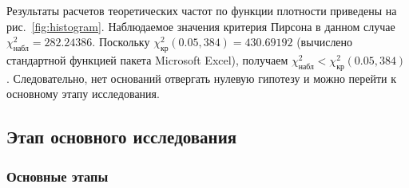\documentclass[a4paper, article, 14pt]{extarticle}
\begin{document}
Результаты расчетов теоретических частот по функции плотности приведены на рис.~\ref{fig:histogram}. Наблюдаемое значения критерия Пирсона в данном случае $\chi_{\text{набл}}^2 = 282.24386$. Поскольку $\chi_{\text{кр}}^2(0.05, 384) = 430.69192$ (вычислено стандартной функцией пакета Microsoft Excel), получаем $\chi_{\text{набл}}^2 < \chi_{\text{кр}}^2(0.05, 384)$. Следовательно, нет оснований отвергать нулевую гипотезу и можно перейти к основному этапу исследования.

\subsection{Этап основного исследования}\label{sec:analysis_part_2}

\subsubsection{Основные этапы}\label{subsec:analysis_part_2_intro}
\end{document}
